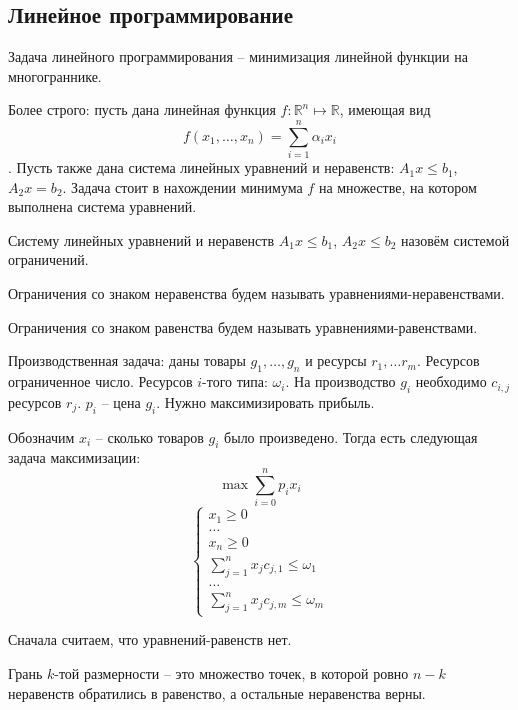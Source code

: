 \documentclass[document.tex]{subfiles}
\begin{document}
\subsection{Линейное программирование}
\begin{Definition}
Задача линейного программирования -- минимизация линейной функции на многограннике.

Более строго: пусть дана линейная функция $f: \mathbb{R}^n \mapsto \mathbb{R}$, имеющая вид $$f(x_1, \ldots, x_n) = \sum_{i=1}^n \alpha_i x_i$$. Пусть также дана система линейных уравнений и неравенств: $A_1x \leq b_1$, $A_2x = b_2$. Задача стоит в нахождении минимума $f$ на множестве, на котором выполнена система уравнений.
\end{Definition}
\begin{definition}
Систему линейных уравнений и неравенств $A_1x \leq b_1$, $A_2x \leq b_2$ назовём системой ограничений.
\end{definition}
\begin{definition}
Ограничения со знаком неравенства будем называть уравнениями-неравенствами.
\end{definition}
\begin{definition}
Ограничения со знаком равенства будем называть уравнениями-равенствами.
\end{definition}
\begin{Example}
Производственная задача: даны товары $g_1, \ldots, g_n$ и ресурсы $r_1, \ldots r_m$. Ресурсов ограниченное число. Ресурсов $i$-того типа: $\omega_i$. На производство $g_i$ необходимо $c_{i, j}$ ресурсов $r_j$. $p_i$ -- цена $g_i$. Нужно максимизировать прибыль.

Обозначим $x_i$ -- сколько товаров $g_i$ было произведено. Тогда есть следующая задача максимизации:
$$\max \sum_{i=0}^n p_i x_i$$
$$\begin{cases}
x_1 \geq 0 \\
\ldots \\
x_n \geq 0 \\
\sum_{j=1}^n x_j c_{j,1} \leq \omega_1 \\
\ldots \\
\sum_{j=1}^n x_j c_{j,m} \leq \omega_m
\end{cases}$$
\end{Example}

\begin{remark}
Сначала считаем, что уравнений-равенств нет.
\end{remark}

\begin{definition}
Грань $k$-той размерности -- это множество точек, в которой ровно $n-k$ неравенств обратились в равенство, а остальные неравенства верны.
\end{definition}
\end{document}
